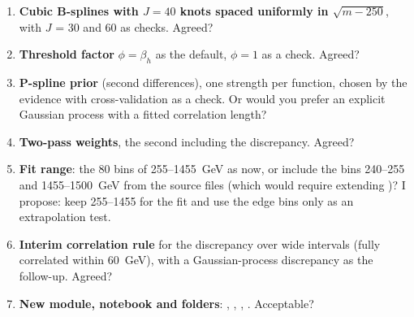 \begin{keyidea}
\begin{enumerate}
  \item \textbf{Cubic B-splines with $J = 40$ knots spaced uniformly in $\sqrt{m - 250}$},
    with $J$ = 30 and 60 as checks. Agreed?
  \item \textbf{Threshold factor} $\phi = \beta_h$ as the default, $\phi = 1$ as a check.
    Agreed?
  \item \textbf{P-spline prior} (second differences), one strength per function, chosen by
    the evidence with cross-validation as a check. Or would you prefer an explicit Gaussian
    process with a fitted correlation length?
  \item \textbf{Two-pass weights}, the second including the discrepancy. Agreed?
  \item \textbf{Fit range}: the 80 bins of 255--1455~GeV as now, or include the bins
    240--255 and 1455--1500~GeV from the source files (which would require extending
    )? I propose: keep 255--1455 for the fit and use the edge bins
    only as an extrapolation test.
  \item \textbf{Interim correlation rule} for the discrepancy over wide intervals (fully
    correlated within 60~GeV), with a Gaussian-process discrepancy as the follow-up. Agreed?
  \item \textbf{New module, notebook and folders}: ,
    , , . Acceptable?
\end{enumerate}
\end{keyidea}


